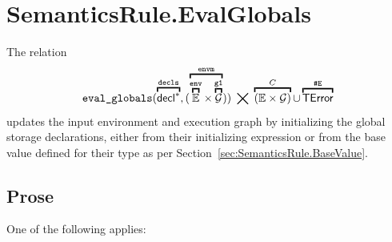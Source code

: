 \documentclass{book}
\newcommand\secref[1]{Section~\ref{sec:#1}}
\newcommand\overname[2]{\overbracket{#1}^{#2}}
\newcommand\XGraphs[0]{\mathcal{G}}
\newcommand\aslrel[0]{\bigtimes}
\newcommand\ErrorConfig[0]{\texttt{\#E}}
\newcommand\TError[0]{\textsf{TError}}
\newcommand\evalglobals[0]{\texttt{eval\_globals}}
\newcommand\env[0]{\texttt{env}}
\newcommand\vgone[0]{\texttt{g1}}
\newcommand\envm[0]{\texttt{envm}}
\newcommand\vdecls[0]{\texttt{decls}}
\begin{document}
\section{SemanticsRule.EvalGlobals \label{sec:SemanticsRule.EvalGlobals}}
The relation
\[
  \evalglobals(\overname{\decl^*}{\vdecls}, (\overname{\overname{\envs}{\env} \times \overname{\XGraphs}{\vgone}}{\envm}))
  \;\aslrel\; \overname{(\envs \times \XGraphs)}{C} \cup \overname{\TError}{\ErrorConfig}
\]
updates the input environment and execution graph by initializing the global storage declarations,
either from their initializing expression or from the base value defined for their type as per \secref{SemanticsRule.BaseValue}.

\subsection{Prose}
One of the following applies:
\end{document}
